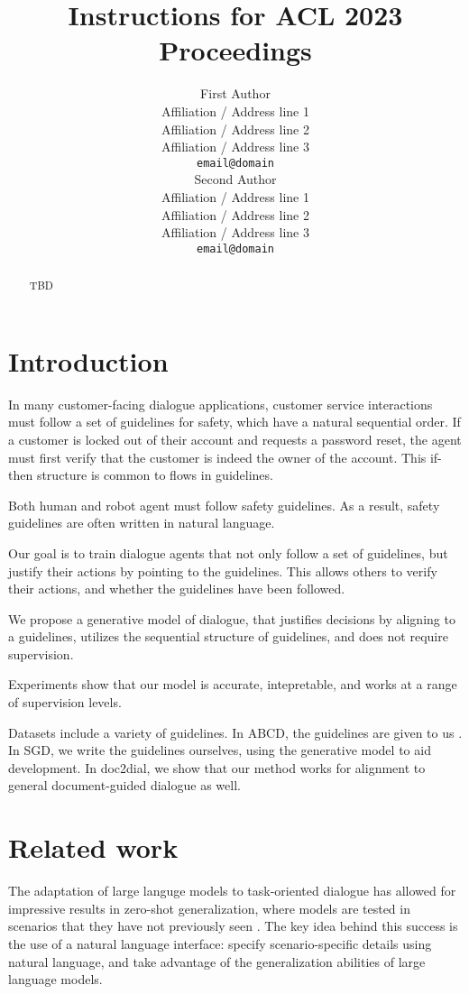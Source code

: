 \documentclass[11pt]{article}
\title{Instructions for ACL 2023 Proceedings}
\author{First Author \\
  Affiliation / Address line 1 \\
  Affiliation / Address line 2 \\
  Affiliation / Address line 3 \\
  \texttt{email@domain} \\\And
  Second Author \\
  Affiliation / Address line 1 \\
  Affiliation / Address line 2 \\
  Affiliation / Address line 3 \\
  \texttt{email@domain} \\}
\begin{document}
\maketitle
\begin{abstract}
TBD
\end{abstract}

\section{Introduction}
In many customer-facing dialogue applications,
customer service interactions must follow a set of guidelines for safety,
which have a natural sequential order.
If a customer is locked out of their account and requests a password reset,
the agent must first verify that the customer is indeed the owner of the account.
This if-then structure is common to flows in guidelines.

Both human and robot agent must follow safety guidelines.
As a result, safety guidelines are often written in natural language.

Our goal is to train dialogue agents that not only follow a set of guidelines,
but justify their actions by pointing to the guidelines.
This allows others to verify their actions, and whether the guidelines have been followed.

We propose a generative model of dialogue,
that justifies decisions by aligning to a guidelines,
utilizes the sequential structure of guidelines,
and does not require supervision.

Experiments show that our model is accurate,
intepretable,
and works at a range of supervision levels.

Datasets include a variety of guidelines.
In ABCD, the guidelines are given to us \citet{abcd}.
In SGD, we write the guidelines ourselves,
using the generative model to aid development.
In doc2dial, we show that our method works for alignment to general document-guided
dialogue as well.

\section{Related work}
The adaptation of large languge models to task-oriented dialogue
has allowed for impressive results in zero-shot generalization,
where models are tested in scenarios that they have not previously seen
\cite{}.
The key idea behind this success is the use of a natural language interface:
specify scenario-specific details using natural language,
and take advantage of the generalization abilities of large language models.
\end{document}

